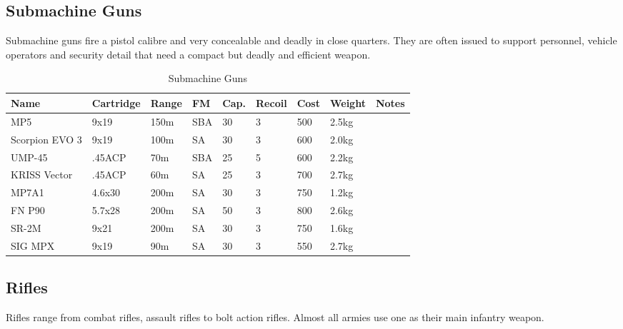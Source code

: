 \subsection{Submachine Guns}

Submachine guns fire a pistol calibre and very concealable and deadly in close
quarters. They are often issued to support personnel, vehicle operators and
security detail that need a compact but deadly and efficient weapon.

\begin{table}
  \caption{Submachine Guns}
  \label{tab:SMG}
  \begin{center}
    \begin{tabular}{| l | l | l | l | l | l | l | l | l |}
      \hline
      \textbf{Name} & \textbf{Cartridge} & \textbf{Range} &
      \textbf{FM} & \textbf{Cap.} & \textbf{Recoil} &
      \textbf{Cost} & \textbf{Weight} & \textbf{Notes} \\ \hline

      MP5            & 9x19   & 150m & SBA & 30 & 3 & 500 & 2.5kg & \\ \hline
      Scorpion EVO 3 & 9x19   & 100m & SA  & 30 & 3 & 600 & 2.0kg & \\ \hline

      UMP-45         & .45ACP &  70m & SBA & 25 & 5 & 600 & 2.2kg & \\ \hline
      KRISS Vector   & .45ACP &  60m & SA  & 25 & 3 & 700 & 2.7kg & \\ \hline

      MP7A1          & 4.6x30 & 200m & SA  & 30 & 3 & 750 & 1.2kg & \\ \hline
      FN P90         & 5.7x28 & 200m & SA  & 50 & 3 & 800 & 2.6kg & \\ \hline
      SR-2M          & 9x21   & 200m & SA  & 30 & 3 & 750 & 1.6kg & \\ \hline
      SIG MPX        & 9x19   &  90m & SA  & 30 & 3 & 550 & 2.7kg & \\ \hline

    \end{tabular}
  \end{center}
\end{table}

\subsection{Rifles}

Rifles range from combat rifles, assault rifles to bolt action rifles. Almost
all armies use one as their main infantry weapon.

